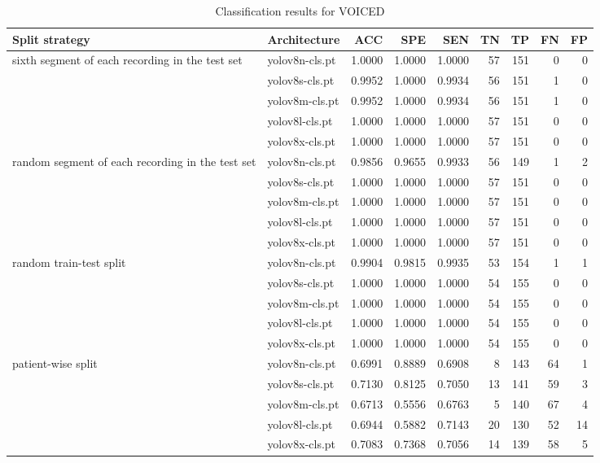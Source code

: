 \begin{table*}
    \centering
    \begin{tabular}{llrrrrrrr}
        \toprule
         Split strategy & Architecture & ACC & SPE & SEN & TN & TP & FN & FP \\
            \midrule
			\multirow{5}{10em}{sixth segment of each recording in the test set} & yolov8n-cls.pt & 1.0000 & 1.0000 & 1.0000 & 57 & 151 & 0 & 0 \\
			 & yolov8s-cls.pt & 0.9952 & 1.0000 & 0.9934 & 56 & 151 & 1 & 0 \\
			 & yolov8m-cls.pt & 0.9952 & 1.0000 & 0.9934 & 56 & 151 & 1 & 0 \\
			 & yolov8l-cls.pt & 1.0000 & 1.0000 & 1.0000 & 57 & 151 & 0 & 0 \\
			 & yolov8x-cls.pt & 1.0000 & 1.0000 & 1.0000 & 57 & 151 & 0 & 0 \\\midrule
			\multirow{5}{10em}{random segment of each recording in the test set} & yolov8n-cls.pt & 0.9856 & 0.9655 & 0.9933 & 56 & 149 & 1 & 2 \\
			 & yolov8s-cls.pt & 1.0000 & 1.0000 & 1.0000 & 57 & 151 & 0 & 0 \\
			 & yolov8m-cls.pt & 1.0000 & 1.0000 & 1.0000 & 57 & 151 & 0 & 0 \\
			 & yolov8l-cls.pt & 1.0000 & 1.0000 & 1.0000 & 57 & 151 & 0 & 0 \\
			 & yolov8x-cls.pt & 1.0000 & 1.0000 & 1.0000 & 57 & 151 & 0 & 0 \\\midrule
			\multirow{5}{10em}{random train-test split} & yolov8n-cls.pt & 0.9904 & 0.9815 & 0.9935 & 53 & 154 & 1 & 1 \\
			 & yolov8s-cls.pt & 1.0000 & 1.0000 & 1.0000 & 54 & 155 & 0 & 0 \\
			 & yolov8m-cls.pt & 1.0000 & 1.0000 & 1.0000 & 54 & 155 & 0 & 0 \\
			 & yolov8l-cls.pt & 1.0000 & 1.0000 & 1.0000 & 54 & 155 & 0 & 0 \\
			 & yolov8x-cls.pt & 1.0000 & 1.0000 & 1.0000 & 54 & 155 & 0 & 0 \\\midrule
			\multirow{5}{10em}{patient-wise split} & yolov8n-cls.pt & 0.6991 & 0.8889 & 0.6908 & 8 & 143 & 64 & 1 \\
			 & yolov8s-cls.pt & 0.7130 & 0.8125 & 0.7050 & 13 & 141 & 59 & 3 \\
			 & yolov8m-cls.pt & 0.6713 & 0.5556 & 0.6763 & 5 & 140 & 67 & 4 \\
			 & yolov8l-cls.pt & 0.6944 & 0.5882 & 0.7143 & 20 & 130 & 52 & 14 \\
			 & yolov8x-cls.pt & 0.7083 & 0.7368 & 0.7056 & 14 & 139 & 58 & 5 \\
        \bottomrule
    \end{tabular}
    \caption{Classification results for VOICED}
    \label{tab:voiced_results}
\end{table*}